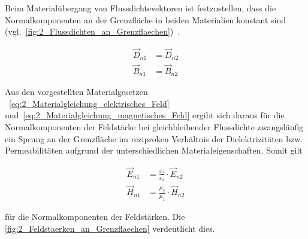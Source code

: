 Beim Materialübergang von Flussdichtevektoren ist festzustellen, dass die Normalkomponenten an der Grenzfläche in beiden Materialien konstant sind (vgl.~\Abb\ref{fig:2_Flussdichten_an_Grenzflaechen})~\cite{EM_Schirmung}.  

\begin{subequations}
\begin{align}
    \vec D_{n1} &= \vec D_{n2} \label{subeq:2_Flussdichtennormale1} \\
    \vec B_{n1} &= \vec B_{n2} \label{subeq:2_Flussdichtennormale2}
\end{align}
\label{eq:2_Flussdichtennormale}
\end{subequations}


Aus den vorgestellten Materialgesetzen \Gleichungen~\eqref{eq:2_Materialgleichung_elektrisches_Feld} und~\eqref{eq:2_Materialgleichung_magnetisches_Feld} ergibt sich daraus für die Normalkomponenten der Feldstärke bei gleichbleibender Flussdichte zwangsläufig ein Sprung an der Grenzfläche im reziproken Verhältnis der Dielektrizitäten bzw. Permeabilitäten aufgrund der unterschiedlichen Materialeigenschaften. Somit gilt

\begin{subequations}
\begin{align}
    \vec E_{n1} &= \frac{\varepsilon_2}{\varepsilon_1} \cdot \vec E_{n2} \label{subeq:2_Feldstaerkenormale1} \\
    \vec H_{n1} &= \frac{\mu_2}{\mu_1} \cdot \vec H_{n2} \label{subeq:2_Feldstaerkenormale2}
\end{align}
\label{eq:2_Feldstaerkenormale}
\end{subequations}

für die Normalkomponenten der Feldstärken. Die \Abb\ref{fig:2_Feldstaerken_an_Grenzflaechen} verdeutlicht dies. 

